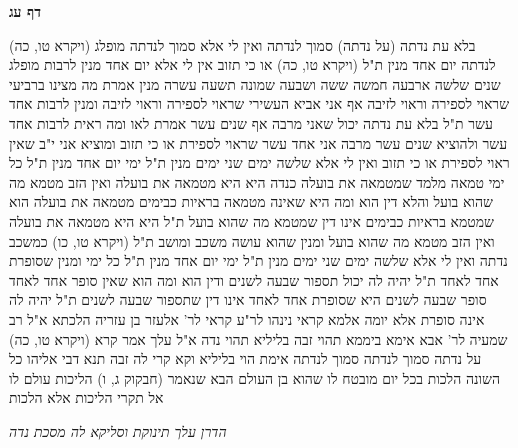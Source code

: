 \documentclass[12pt, openany]{book}
\newcommand{\sethebfont}{
\fontsize{10.5pt}{21.0pt} \selectfont
}
\newcommand{\twocol}[1]{
	{\sethebfont \begin{multicols}{2}
			#1
	\end{multicols}}	
}
\newcommand{\sectname}{}
\newcommand{\newsection}[1]{
	\addcontentsline{toc}{section}{#1}
	\renewcommand{\sectname}{#1}	
	\vspace{-\baselineskip}
	\begin{center}
		\textbf{%
\fontsize{16pt}{16pt}\selectfont
			#1}
	\end{center}
	\vspace{-\baselineskip}
	\nopagebreak
}
\begin{document}
\newsection{דף עג}
\twocol{(ויקרא טו, כה) בלא עת נדתה (על נדתה) סמוך לנדתה 
ואין לי אלא סמוך לנדתה מופלג לנדתה יום אחד מנין  ת"ל (ויקרא טו, כה) או כי תזוב 
אין לי אלא יום אחד מנין לרבות מופלג שנים שלשה ארבעה חמשה ששה ושבעה שמונה תשעה עשרה מנין 
אמרת  מה מצינו ברביעי שראוי לספירה וראוי לזיבה אף אני אביא העשירי שראוי לספירה וראוי לזיבה 
ומנין לרבות אחד עשר  ת"ל בלא עת נדתה  יכול שאני מרבה אף שנים עשר  אמרת  לאו 
ומה ראית לרבות אחד עשר ולהוציא שנים עשר  מרבה אני אחד עשר שראוי לספירת או כי תזוב  ומוציא אני י"ב שאין ראוי לספירת או כי תזוב 
ואין לי אלא שלשה ימים שני ימים מנין  ת"ל ימי  יום אחד מנין  ת"ל כל ימי
טמאה מלמד שמטמאה את בועלה כנדה  היא היא מטמאה את בועלה ואין הזב מטמא מה שהוא בועל 
והלא דין הוא  ומה היא שאינה מטמאה בראיות כבימים מטמאה את בועלה הוא שמטמא בראיות כבימים אינו דין שמטמא מה שהוא בועל  ת"ל היא היא מטמאה את בועלה ואין הזב מטמא מה שהוא בועל 
ומנין שהוא עושה משכב ומושב  ת"ל (ויקרא טו, כו) כמשכב נדתה 
ואין לי אלא שלשה ימים שני ימים מנין  ת"ל ימי  יום אחד מנין  ת"ל כל ימי 
ומנין שסופרת אחד לאחד  ת"ל יהיה לה  יכול תספור שבעה לשנים ודין הוא  ומה הוא שאין סופר אחד לאחד סופר שבעה לשנים היא שסופרת אחד לאחד אינו דין שתספור שבעה לשנים  ת"ל יהיה לה אינה סופרת אלא יומה
אלמא קראי נינהו  לר"ע קראי לר' אלעזר בן עזריה הלכתא 
א"ל רב שמעיה לר' אבא  אימא ביממא תהוי זבה בליליא תהוי נדה  א"ל  עלך אמר קרא (ויקרא טו, כה) על נדתה סמוך לנדתה סמוך לנדתה אימת הוי  בליליא וקא קרי לה זבה 
תנא דבי אליהו  כל השונה הלכות בכל יום מובטח לו שהוא בן העולם הבא שנאמר (חבקוק ג, ו) הליכות עולם לו אל תקרי הליכות אלא הלכות
\par \par {\large\emph{הדרן עלך תינוקת וסליקא לה מסכת נדה}}\par \par 
}
\end{document}
